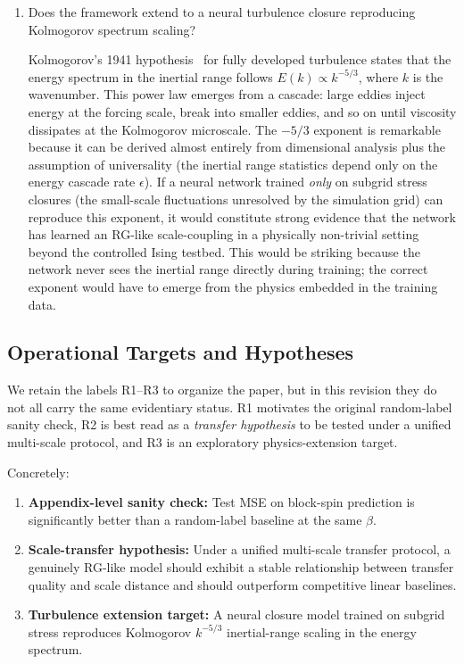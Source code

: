 \documentclass[12pt,a4paper]{memoir}
\begin{document}
\begin{enumerate}
    \item Does the framework extend to a neural turbulence closure reproducing
        Kolmogorov spectrum scaling?

        Kolmogorov's 1941 hypothesis~\citep{kolmogorov1941} for fully developed
        turbulence states that the energy spectrum in the inertial range follows
        $E(k) \propto k^{-5/3}$, where $k$ is the wavenumber.  This power law
        emerges from a cascade: large eddies inject energy at the forcing scale,
        break into smaller eddies, and so on until viscosity dissipates at the
        Kolmogorov microscale.  The $-5/3$ exponent is remarkable because it can
        be derived almost entirely from dimensional analysis plus the assumption
        of universality (the inertial range statistics depend only on the energy
        cascade rate $\epsilon$).  If a neural network trained \emph{only} on
        subgrid stress closures (the small-scale fluctuations unresolved by the
        simulation grid) can reproduce this exponent, it would constitute strong
        evidence that the network has learned an RG-like scale-coupling in a
        physically non-trivial setting beyond the controlled Ising testbed.
        This would be striking because the network never sees the inertial range
        directly during training; the correct exponent would have to emerge from
        the physics embedded in the training data.
\end{enumerate}

\subsection{Operational Targets and Hypotheses}
\label{sec:operational_def}

We retain the labels R1--R3 to organize the paper, but in this revision they
do not all carry the same evidentiary status.  R1 motivates the original
random-label sanity check, R2 is best read as a \emph{transfer hypothesis} to
be tested under a unified multi-scale protocol, and R3 is an exploratory
physics-extension target.

\medskip\noindent
Concretely:
\begin{enumerate}
    \item[(R1)] \textbf{Appendix-level sanity check:} Test MSE on block-spin prediction
        is significantly better than a random-label baseline at the same $\beta$.
    \item[(R2)] \textbf{Scale-transfer hypothesis:} Under a unified multi-scale
        transfer protocol, a genuinely RG-like model should exhibit a stable
        relationship between transfer quality and scale distance and should
        outperform competitive linear baselines.
    \item[(R3)] \textbf{Turbulence extension target:} A neural closure model trained
        on subgrid stress reproduces Kolmogorov $k^{-5/3}$ inertial-range scaling
        in the energy spectrum.
\end{enumerate}
\end{document}

